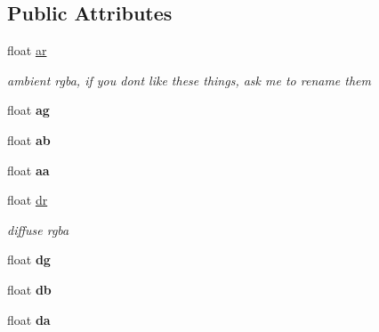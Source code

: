 \subsection*{Public Attributes}
\begin{DoxyCompactItemize}
\item 
float \hyperlink{structGFXMaterial_acf97653259b52b674a2e66b9bb453cad}{ar}\hypertarget{structGFXMaterial_acf97653259b52b674a2e66b9bb453cad}{}\label{structGFXMaterial_acf97653259b52b674a2e66b9bb453cad}

\begin{DoxyCompactList}\small\item\em ambient rgba, if you don\textquotesingle{}t like these things, ask me to rename them \end{DoxyCompactList}\item 
float {\bfseries ag}\hypertarget{structGFXMaterial_a3be0d8602d33780ff7224efddc66cdbb}{}\label{structGFXMaterial_a3be0d8602d33780ff7224efddc66cdbb}

\item 
float {\bfseries ab}\hypertarget{structGFXMaterial_aaf09854858d941fdce532fb8890e7622}{}\label{structGFXMaterial_aaf09854858d941fdce532fb8890e7622}

\item 
float {\bfseries aa}\hypertarget{structGFXMaterial_a63da785611864d459ea6281b74ca08e9}{}\label{structGFXMaterial_a63da785611864d459ea6281b74ca08e9}

\item 
float \hyperlink{structGFXMaterial_a21e4d343b87179f743f83dbba6f97579}{dr}\hypertarget{structGFXMaterial_a21e4d343b87179f743f83dbba6f97579}{}\label{structGFXMaterial_a21e4d343b87179f743f83dbba6f97579}

\begin{DoxyCompactList}\small\item\em diffuse rgba \end{DoxyCompactList}\item 
float {\bfseries dg}\hypertarget{structGFXMaterial_af81d9833567d0f28c90c3e140ee10671}{}\label{structGFXMaterial_af81d9833567d0f28c90c3e140ee10671}

\item 
float {\bfseries db}\hypertarget{structGFXMaterial_ad94b8f8cbbcc0a6b4ca1ae5f55fcf53d}{}\label{structGFXMaterial_ad94b8f8cbbcc0a6b4ca1ae5f55fcf53d}

\item 
float {\bfseries da}\hypertarget{structGFXMaterial_a8ca13cdb367559716e000a382727618c}{}\label{structGFXMaterial_a8ca13cdb367559716e000a382727618c}


\end{DoxyCompactItemize}
